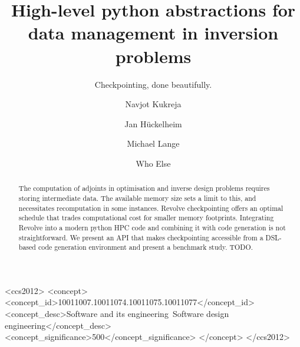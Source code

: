 \documentclass[sigconf]{acmart}
\begin{document}
\title{High-level python abstractions for data management in inversion problems}
\subtitle{Checkpointing, done beautifully.}


\author{Navjot Kukreja}
\author{Jan H\"uckelheim}
\author{Michael Lange}
\author{Who Else}

\renewcommand\shortauthors{Kukreja, N. et al}

\begin{abstract}
The computation of adjoints in optimisation and inverse design problems requires storing intermediate data. The available memory size sets a limit to this, and necessitates recomputation in some instances. Revolve checkpointing offers an optimal schedule that trades computational cost for smaller memory footprints. Integrating Revolve into a modern python HPC code and combining it with code generation is not straightforward. We present an API that makes checkpointing accessible from a DSL-based code generation environment and present a benchmark study. TODO.
\end{abstract}

%
%
\begin{CCSXML}
<ccs2012>
<concept>
<concept_id>10011007.10011074.10011075.10011077</concept_id>
<concept_desc>Software and its engineering~Software design engineering</concept_desc>
<concept_significance>500</concept_significance>
</concept>
</ccs2012>
\end{CCSXML}

%
%


\end{document}
